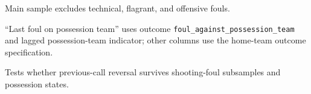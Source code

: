 \begin{table}[htbp]
\centering
\caption{Possession-cycle robustness (sequential logit, clustered by game)}
\label{tab:possession_robustness}
\small
\begin{threeparttable}
\begin{tablenotes}[flushleft]
\small
\item[] Main sample excludes technical, flagrant, and offensive fouls.
\item[] ``Last foul on possession team'' uses outcome \texttt{foul\_against\_possession\_team} and lagged possession-team indicator; other columns use the home-team outcome specification.
\item[] Tests whether previous-call reversal survives shooting-foul subsamples and possession states.
\end{tablenotes}
\end{threeparttable}
\end{table}

